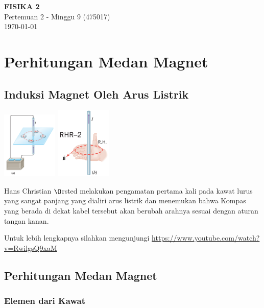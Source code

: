 \documentclass[twocolumn, 11pt]{article}%
\begin{document}
\begin{strip}
  \vspace*{\dimexpr-\stripsep}
  \begin{center}
      \Large\textbf{FISIKA 2}\\
      \large{Pertemuan 2 - Minggu 9 (475017)}\\
      \large{\today}
   \end{center}
\end{strip}

\section{Perhitungan Medan Magnet}
\subsection{Induksi Magnet Oleh Arus Listrik}%

\begin{center}
    \includegraphics[width=100px]{1.png}
    \includegraphics[width=100px]{2.png}
\end{center}
Hans Christian $\O$rsted melakukan pengamatan pertama kali pada kawat
lurus yang sangat panjang yang dialiri arus listrik dan menemukan bahwa
Kompas yang berada di dekat kabel tersebut akan berubah arahnya sesuai
dengan aturan tangan kanan.

Untuk lebih lengkapnya silahkan mengunjungi \url{https://www.youtube.com/watch?v=RwilgsQ9xaM}

\subsection{Perhitungan Medan Magnet}%
\subsubsection{Elemen dari Kawat}%
\end{document}
